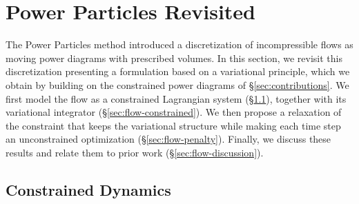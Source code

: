 \documentclass[main.tex]{subfiles}
\begin{document}

\section{Power Particles Revisited}
\label{sec:flow}

The Power Particles method \cite{deGoes2015PowerParticles} introduced a discretization of incompressible flows as moving power diagrams with prescribed volumes.
In this section, we revisit this discretization presenting a formulation based on a variational principle, which we obtain by building on the constrained power diagrams of \S\ref{sec:contributions}.
We first model the flow as a constrained Lagrangian system (\S\ref{sec:flow-dynamics}), together with its variational integrator (\S\ref{sec:flow-constrained}).
We then propose a relaxation of the constraint that keeps the variational structure while making each time step an unconstrained optimization (\S\ref{sec:flow-penalty}).
Finally, we discuss these results and relate them to prior work (\S\ref{sec:flow-discussion}).

\subsection{Constrained Dynamics}
\label{sec:flow-dynamics}
\end{document}
